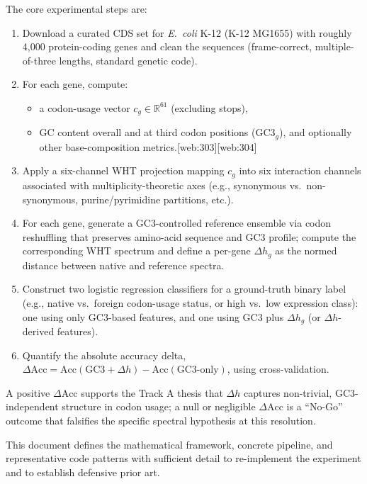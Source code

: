 \documentclass[11pt]{article}
\newcommand{\R}{\mathbb{R}}
\begin{document}
The core experimental steps are:
\begin{enumerate}[leftmargin=1.8em]
  \item Download a curated CDS set for \emph{E.~coli} K-12 (K-12 MG1655) with roughly 4,000 protein-coding genes and clean the sequences (frame-correct, multiple-of-three lengths, standard genetic code).
  \item For each gene, compute:
    \begin{itemize}
      \item a codon-usage vector \(c_g \in \R^{61}\) (excluding stops),
      \item GC content overall and at third codon positions (\(\mathrm{GC3}_g\)), and optionally other base-composition metrics.[web:303][web:304]
    \end{itemize}
  \item Apply a six-channel WHT projection mapping \(c_g\) into six interaction channels associated with multiplicity-theoretic axes (e.g., synonymous vs.\ non-synonymous, purine/pyrimidine partitions, etc.).
  \item For each gene, generate a GC3-controlled reference ensemble via codon reshuffling that preserves amino-acid sequence and GC3 profile; compute the corresponding WHT spectrum and define a per-gene \(\Delta h_g\) as the normed distance between native and reference spectra.
  \item Construct two logistic regression classifiers for a ground-truth binary label (e.g., native vs.\ foreign codon-usage status, or high vs.\ low expression class): one using only GC3-based features, and one using GC3 plus \(\Delta h_g\) (or \(\Delta h\)-derived features).
  \item Quantify the absolute accuracy delta, \(\Delta \mathrm{Acc} = \mathrm{Acc}(\text{GC3}+\Delta h) - \mathrm{Acc}(\text{GC3-only})\), using cross-validation.
\end{enumerate}

A positive \(\Delta \mathrm{Acc}\) supports the Track A thesis that \(\Delta h\) captures non-trivial, GC3-independent structure in codon usage; a null or negligible \(\Delta \mathrm{Acc}\) is a ``No-Go'' outcome that falsifies the specific spectral hypothesis at this resolution.

This document defines the mathematical framework, concrete pipeline, and representative code patterns with sufficient detail to re-implement the experiment and to establish defensive prior art.

\end{document}
